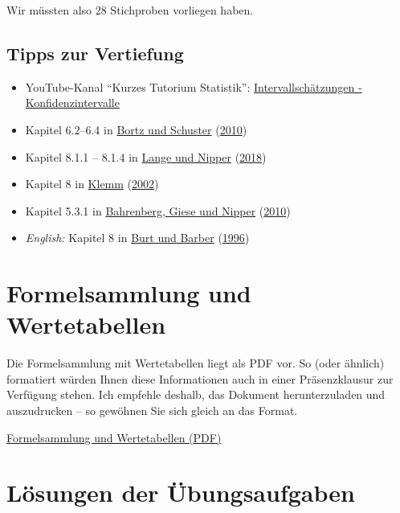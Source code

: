 \documentclass[
  11pt,
  ngerman,
  a4paper,
]{report}
\providecommand{\tightlist}{%
  \setlength{\itemsep}{0pt}\setlength{\parskip}{0pt}}
\begin{document}
Wir müssten also 28 Stichproben vorliegen haben.

\hypertarget{tipps-zur-vertiefung-3}{%
\section*{Tipps zur Vertiefung}\label{tipps-zur-vertiefung-3}}

\begin{itemize}
\tightlist
\item
  YouTube-Kanal \enquote{Kurzes Tutorium Statistik}: \href{https://www.youtube.com/watch?v=DdwTa28W4Os}{Intervallschätzungen - Konfidenzintervalle}
\item
  Kapitel 6.2--6.4 in \protect\hyperlink{ref-bortz}{Bortz und Schuster} (\protect\hyperlink{ref-bortz}{2010})
\item
  Kapitel 8.1.1 -- 8.1.4 in \protect\hyperlink{ref-delange}{Lange und Nipper} (\protect\hyperlink{ref-delange}{2018})
\item
  Kapitel 8 in \protect\hyperlink{ref-klemm}{Klemm} (\protect\hyperlink{ref-klemm}{2002})
\item
  Kapitel 5.3.1 in \protect\hyperlink{ref-bahrenberg}{Bahrenberg, Giese und Nipper} (\protect\hyperlink{ref-bahrenberg}{2010})
\item
  \emph{English:} Kapitel 8 in \protect\hyperlink{ref-burt}{Burt und Barber} (\protect\hyperlink{ref-burt}{1996})
\end{itemize}

\hypertarget{formelsammlung-und-wertetabellen}{%
\chapter*{Formelsammlung und Wertetabellen}\label{formelsammlung-und-wertetabellen}}

Die Formelsammlung mit Wertetabellen liegt als PDF vor. So (oder ähnlich) formatiert würden Ihnen diese Informationen auch in einer Präsenzklausur zur Verfügung stehen. Ich empfehle deshalb, das Dokument herunterzuladen und auszudrucken -- so gewöhnen Sie sich gleich an das Format.

\href{Formelsammlung\%20und\%20Wertetabellen.pdf}{Formelsammlung und Wertetabellen (PDF)}

\hypertarget{luxf6sungen-der-uxfcbungsaufgaben}{%
\chapter*{Lösungen der Übungsaufgaben}\label{luxf6sungen-der-uxfcbungsaufgaben}}
\end{document}
